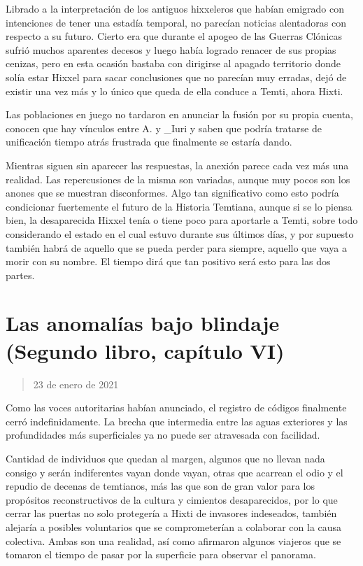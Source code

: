 \documentclass[
]{book}
\begin{document}
Librado a la interpretación de los antiguos hixxeleros que habían emigrado con intenciones de tener una estadía temporal, no parecían noticias alentadoras con respecto a su futuro. Cierto era que durante el apogeo de las Guerras Clónicas sufrió muchos aparentes decesos y luego había logrado renacer de sus propias cenizas, pero en esta ocasión bastaba con dirigirse al apagado territorio donde solía estar Hixxel para sacar conclusiones que no parecían muy erradas, dejó de existir una vez más y lo único que queda de ella conduce a Temti, ahora Hixti.

Las poblaciones en juego no tardaron en anunciar la fusión por su propia cuenta, conocen que hay vínculos entre A. y \_Iuri y saben que podría tratarse de unificación tiempo atrás frustrada que finalmente se estaría dando.

Mientras siguen sin aparecer las respuestas, la anexión parece cada vez más una realidad. Las repercusiones de la misma son variadas, aunque muy pocos son los anones que se muestran disconformes. Algo tan significativo como esto podría condicionar fuertemente el futuro de la Historia Temtiana, aunque si se lo piensa bien, la desaparecida Hixxel tenía o tiene poco para aportarle a Temti, sobre todo considerando el estado en el cual estuvo durante sus últimos días, y por supuesto también habrá de aquello que se pueda perder para siempre, aquello que vaya a morir con su nombre. El tiempo dirá que tan positivo será esto para las dos partes.

\hypertarget{las-anomaluxedas-bajo-blindaje-segundo-libro-capuxedtulo-vi}{%
\section{Las anomalías bajo blindaje (Segundo libro, capítulo VI)}\label{las-anomaluxedas-bajo-blindaje-segundo-libro-capuxedtulo-vi}}

\begin{quote}
23 de enero de 2021
\end{quote}

Como las voces autoritarias habían anunciado, el registro de códigos finalmente cerró indefinidamente. La brecha que intermedia entre las aguas exteriores y las profundidades más superficiales ya no puede ser atravesada con facilidad.

Cantidad de individuos que quedan al margen, algunos que no llevan nada consigo y serán indiferentes vayan donde vayan, otras que acarrean el odio y el repudio de decenas de temtianos, más las que son de gran valor para los propósitos reconstructivos de la cultura y cimientos desaparecidos, por lo que cerrar las puertas no solo protegería a Hixti de invasores indeseados, también alejaría a posibles voluntarios que se comprometerían a colaborar con la causa colectiva. Ambas son una realidad, así como afirmaron algunos viajeros que se tomaron el tiempo de pasar por la superficie para observar el panorama.
\end{document}
